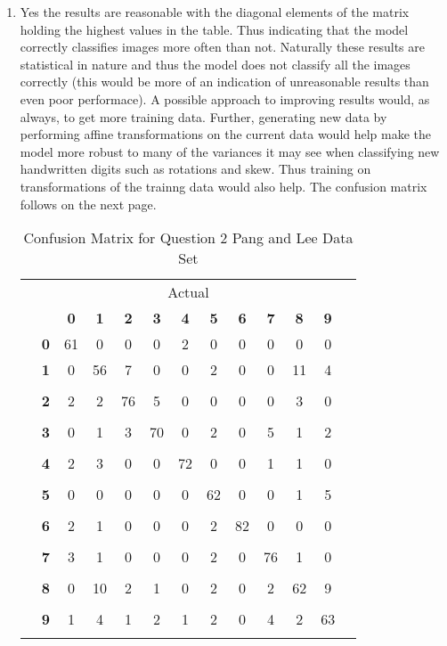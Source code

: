 \documentclass{article}
\begin{document}
\begin{enumerate}
		\item Yes the results are reasonable with the diagonal elements of the matrix holding the highest values in the table. Thus indicating that the model correctly classifies images more often than not. Naturally these results are statistical in nature and thus the model does not classify all the images correctly (this would be more of an indication of unreasonable results than even poor performace). A possible approach to improving results would, as always, to get more training data. Further, generating new data by performing affine transformations on the current data would help make the model more robust to many of the variances it may see when classifying new handwritten digits such as rotations and skew. Thus training on transformations of the trainng data would also help. The confusion matrix follows on the next page.
		\begin{table}[h!]
				\begin{center}
					\caption{Confusion Matrix for Question 2 Pang and Lee Data Set}
					\label{tab:table2}
					\begin{tabular}{l|l|c|c|c|c|c|c|c|c|c|c|c}
						 \multicolumn{13}{c}{Actual} \\
						 \multirow{20}{*}{\rotatebox[origin=c]{90}{ Predicted}} & &\textbf{0}&\textbf{1}&\textbf{2}&\textbf{3}&\textbf{4}&\textbf{5}&\textbf{6}&\textbf{7}&\textbf{8}&\textbf{9}\\
						&\textbf{0} &61&0&0&0&2&0&0&0&0&0& \\
						&\textbf{1} &0&56&7&0&0&2&0&0&11&4&\\ \\
						&\textbf{2} &2&2&76&5&0&0&0&0&3&0&\\ \\
						&\textbf{3} &0&1&3&70&0&2&0&5&1&2&\\ \\
						&\textbf{4} &2&3&0&0&72&0&0&1&1&0&\\ \\
						&\textbf{5} &0&0&0&0&0&62&0&0&1&5&\\ \\
						&\textbf{6} &2&1&0&0&0&2&82&0&0&0&\\ \\
						&\textbf{7} &3&1&0&0&0&2&0&76&1&0&\\ \\
						&\textbf{8} &0&10&2&1&0&2&0&2&62&9&\\ \\
						&\textbf{9} &1&4&1&2&1&2&0&4&2&63&\\ \\ 				
					\end{tabular}
				\end{center}
			\end{table}
	\end{enumerate}
\end{document}
